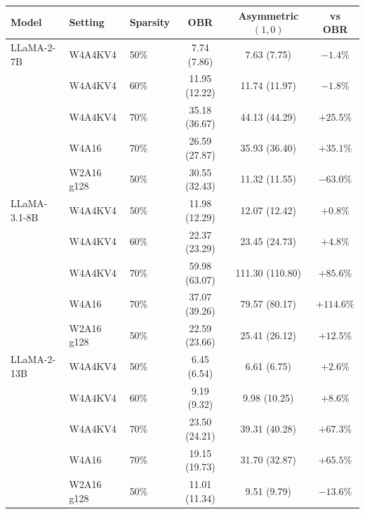 \begin{tabular}{lllccc}
\toprule
Model & Setting & Sparsity & OBR & Asymmetric $(1,0)$ & vs OBR \\
\midrule
LLaMA-2-7B & W4A4KV4 & 50\% & 7.74 (7.86) & 7.63 (7.75) & $-1.4\%$ \\
 & W4A4KV4 & 60\% & 11.95 (12.22) & 11.74 (11.97) & $-1.8\%$ \\
 & W4A4KV4 & 70\% & 35.18 (36.67) & 44.13 (44.29) & $+25.5\%$ \\
 & W4A16 & 70\% & 26.59 (27.87) & 35.93 (36.40) & $+35.1\%$ \\
 & W2A16 g128 & 50\% & 30.55 (32.43) & 11.32 (11.55) & $-63.0\%$ \\
\midrule
LLaMA-3.1-8B & W4A4KV4 & 50\% & 11.98 (12.29) & 12.07 (12.42) & $+0.8\%$ \\
 & W4A4KV4 & 60\% & 22.37 (23.29) & 23.45 (24.73) & $+4.8\%$ \\
 & W4A4KV4 & 70\% & 59.98 (63.07) & 111.30 (110.80) & $+85.6\%$ \\
 & W4A16 & 70\% & 37.07 (39.26) & 79.57 (80.17) & $+114.6\%$ \\
 & W2A16 g128 & 50\% & 22.59 (23.66) & 25.41 (26.12) & $+12.5\%$ \\
\midrule
LLaMA-2-13B & W4A4KV4 & 50\% & 6.45 (6.54) & 6.61 (6.75) & $+2.6\%$ \\
 & W4A4KV4 & 60\% & 9.19 (9.32) & 9.98 (10.25) & $+8.6\%$ \\
 & W4A4KV4 & 70\% & 23.50 (24.21) & 39.31 (40.28) & $+67.3\%$ \\
 & W4A16 & 70\% & 19.15 (19.73) & 31.70 (32.87) & $+65.5\%$ \\
 & W2A16 g128 & 50\% & 11.01 (11.34) & 9.51 (9.79) & $-13.6\%$ \\
\bottomrule
\end{tabular}

